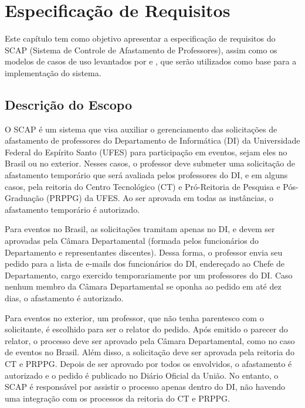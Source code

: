 \chapter{Especificação de Requisitos}
\label{chap-especificacao-requisitos}

Este capítulo tem como objetivo apresentar a especificação de requisitos do SCAP (Sistema de Controle de Afastamento de Professores), 
assim como os modelos de casos de uso levantados por  e , que serão utilizados como base para a implementação do sistema.

\section{Descrição do Escopo}
\label{sec-espec-escopo}
O SCAP é um sistema que visa auxiliar o gerenciamento das solicitações de
afastamento de professores do Departamento de Informática (DI) da Universidade Federal do Espírito Santo (UFES)
para participação em eventos, sejam eles no Brasil ou no exterior. 
Nesses casos, o professor deve submeter uma solicitação de afastamento temporário
que será avaliada pelos professores do DI, e em alguns casos,
pela reitoria do Centro Tecnológico (CT) e Pró-Reitoria de Pesquisa e Pós-Graduação (PRPPG) da UFES.
Ao ser aprovada em todas as instâncias, o afastamento temporário é autorizado.

Para eventos no Brasil, as solicitações tramitam apenas no DI, e devem ser
aprovadas pela Câmara Departamental (formada pelos funcionários do Departamento
e representantes discentes). Dessa forma, o professor envia seu pedido para a
lista de e-mails dos funcionários do DI, endereçado ao Chefe de Departamento,
cargo exercido temporariamente por um professores do DI. Caso nenhum membro
da Câmara Departamental se oponha ao pedido em até dez dias, o afastamento é autorizado.

Para eventos no exterior, um professor, que não tenha parentesco com o solicitante,
é escolhido para ser o relator do pedido. Após emitido o parecer do relator, o
processo deve ser aprovado pela Câmara Departamental, como no caso de eventos no Brasil.
Além disso, a solicitação deve ser aprovada pela reitoria do CT e PRPPG.
Depois de ser aprovado por todos os envolvidos, o afastamento é autorizado
e o pedido é publicado no Diário Oficial da União. 
No entanto, o SCAP é responsável por assistir o processo apenas dentro do DI,
não havendo uma integração com os processos da reitoria do CT e PRPPG.

